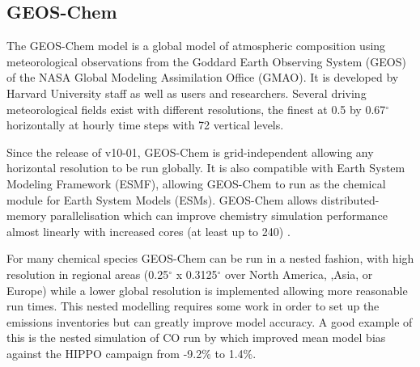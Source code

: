 \subsection{GEOS-Chem}

The GEOS-Chem model is a global model of atmospheric composition using meteorological observations from the Goddard Earth Observing System (GEOS) of the NASA Global Modeling Assimilation Office (GMAO). 
It is developed by Harvard University staff as well as users and researchers. 
Several driving meteorological fields exist with different resolutions, the finest at 0.5 by 0.67$^\circ$ horizontally at hourly time steps with 72 vertical levels.

Since the release of v10-01, GEOS-Chem is grid-independent allowing any horizontal resolution to be run globally. 
It is also compatible with Earth System Modeling Framework (ESMF), allowing GEOS-Chem to run as the chemical module for Earth System Models (ESMs). 
GEOS-Chem allows distributed-memory parallelisation which can improve chemistry simulation performance almost linearly with increased cores (at least up to 240) \cite{Long_2015}.

For many chemical species GEOS-Chem can be run in a nested fashion, with high resolution in regional areas (0.25$^{\circ}$ x 0.3125$^{\circ}$ over North America, ,Asia, or Europe) while a lower global resolution is implemented allowing more reasonable run times.
This nested modelling requires some work in order to set up the emissions inventories but can greatly improve model accuracy.
A good example of this is the nested simulation of CO run by \citet{Yan_2014} which improved mean model bias against the HIPPO campaign from -9.2\% to 1.4\%.

